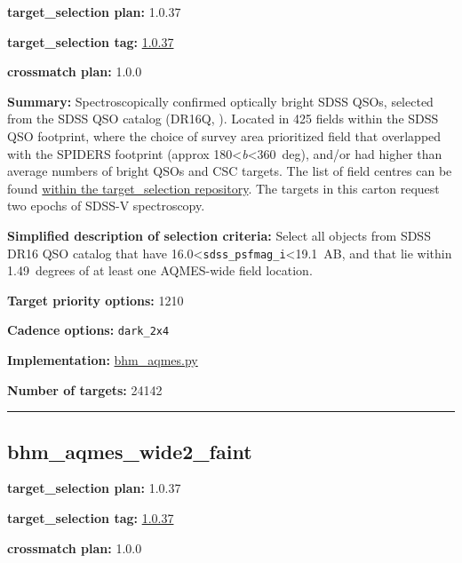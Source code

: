 \noindent\textbf{target\_selection plan:} 1.0.37

\noindent\textbf{target\_selection tag:}
\href{https://github.com/sdss/target_selection/tree/1.0.37/}{1.0.37}

\noindent\textbf{crossmatch plan:} 1.0.0

\noindent\textbf{Summary:} Spectroscopically confirmed optically bright SDSS
QSOs, selected from the SDSS QSO catalog (DR16Q,
\citealt{Lyke2020}). Located in 425 fields within the SDSS QSO footprint,
where the choice of survey area prioritized field that overlapped with
the SPIDERS footprint (approx 180\textless{}\emph{b}\textless360~deg),
and/or had higher than average numbers of bright QSOs and CSC targets.
The list of field centres can be found
\href{https://github.com/sdss/target_selection/blob/0.3.0/python/target_selection/masks/candidate_target_fields_bhm_aqmes_wide_v0.3.1.fits}{within
the target\_selection repository}. The targets in this carton request
two epochs of SDSS-V spectroscopy.

\noindent\textbf{Simplified description of selection criteria:} Select all
objects from SDSS DR16 QSO catalog that have
16.0\textless{}\texttt{sdss\_psfmag\_i}\textless19.1~AB, and that lie
within 1.49~degrees of at least one AQMES-wide field location.


\noindent\textbf{Target priority options:} 1210

\noindent\textbf{Cadence options:} \texttt{dark\_2x4}

\noindent\textbf{Implementation:}
\href{https://github.com/sdss/target_selection/blob/1.0.37/python/target_selection/cartons/bhm_aqmes.py}{bhm\_aqmes.py}

\noindent\textbf{Number of targets:} 24142

\begin{center}\rule{0.5\linewidth}{0.5pt}\end{center}

\hypertarget{bhm_aqmes_wide2_faint_plan1.0.37}{%
\subsection{bhm\_aqmes\_wide2\_faint}\label{bhm_aqmes_wide2_faint_plan1.0.37}}

\noindent\textbf{target\_selection plan:} 1.0.37

\noindent\textbf{target\_selection tag:}
\href{https://github.com/sdss/target_selection/tree/1.0.37/}{1.0.37}

\noindent\textbf{crossmatch plan:} 1.0.0

